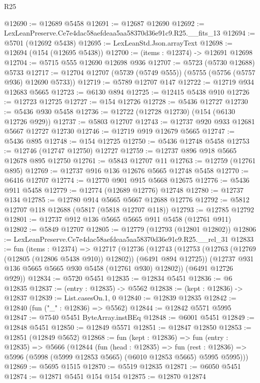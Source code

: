 \begin{lexlean}{R25}
\begin{coremodule}
@12690 := @12689 @5458
@12691 := @12687 @12690
@12692 := LexLeanPreserve.Ce7e4dac58aefdeaa5aa58370d36e91c9.R25.__fits_13
@12694 := @5701 (@12692 @5438)
@12695 := LexLeanStd.Json.arrayText
@12698 := @12694 (@154 (@12695 @5438))
@12700 := (items : @12374) -> @12691 @12698
@12704 := @5715 @555 @12690 @12698 @936
@12707 := @5723 (@5730 @12688) @5733
@12717 := @12704 @12707 (@5739 (@5749 @555)) (@5755 (@5756 (@5757 @936) @12690 @5733))
@12719 := @5789 @12707 @147
@12722 := @12719 @934 @12683 @5665
@12723 := @6130 @894
@12725 := @12415 @5438 @910
@12726 := @12723 @12725
@12727 := @154 @12726
@12728 := @5436 @12727
@12730 := @5436 @930 @5458
@12736 := @12722 (@12728 @12730) (@154 (@6130 @12726 @929))
@12737 := @5803 @12707
@12743 := @12737 @920 @933 @12681 @5667 @12727 @12730
@12746 := @12719 @919 @12679 @5665
@12747 := @5436 @895
@12748 := @154 @12725
@12750 := @5436 @12748 @5458
@12753 := @12746 (@12747 @12750) @12727
@12759 := @12737 @896 @918 @5665 @12678 @895 @12750
@12761 := @5843 @12707 @11
@12763 := @12759 (@12761 @895)
@12769 := @12737 @916 @136 @12676 @5665 @12748 @5458
@12770 := @6416 @12707
@12774 := @12770 @901 @915 @5668 @12675
@12776 := @5436 @911 @5458
@12779 := @12774 (@12689 @12776) @12748
@12780 := @12737 @134
@12785 := @12780 @914 @5665 @5667 @12688 @12776
@12792 := @5812 @12707 @118 @12688 (@5817 (@5818 @12707 @118))
@12793 := @12785 @12792
@12801 := @12737 @912 @136 @5665 @5665 @911 @5458 (@12761 @911)
@12802 := @5849 @12707
@12805 := @12779 (@12793 (@12801 @12802))
@12806 := LexLeanPreserve.Ce7e4dac58aefdeaa5aa58370d36e91c9.R25.__rel_31
@12833 := fun (items : @12374) =>
  @12717
    (@12736
      (@12743
        (@12753 (@12763 (@12769 (@12805 (@12806 @5438 @910)) @12802)) (@6491 @894 @12725))
        (@12737 @931 @136 @5665 @5665 @930 @5458 (@12761 @930) @12802))
      (@6491 @12726 @929))
@12834 := @5720 @5451
@12835 := @12834 @5451
@12836 := @6 @12835
@12837 := (entry : @12835) -> @5562
@12838 := (kept : @12836) -> @12837
@12839 := List.casesOn.{1, 0}
@12840 := @12839 @12835
@12842 := @12840 (fun ("_" : @12836) => @5562)
@12844 := @12842 @5571 @5995
@12847 := @7540 @5451 ByteArray.instBEq
@12848 := @6001 @5451
@12849 := @12848 @5451
@12850 := @12849 @5571
@12851 := @12847 @12850
@12853 := @12851 (@12849 @5652)
@12868 := fun (kept : @12836) =>
  fun (entry : @12835) =>
  @5666
    (@12844
      (fun (head : @12835) =>
      fun (rest : @12836) => @5996 (@5998 (@5999 @12853 @5665) (@6010 @12853 @5665) @5995 @5995)))
@12869 := @5695 @1515
@12870 := @5519 @12835
@12871 := @6050 @5451
@12874 := @12871 @5451 @154 @154
@12875 := @12870 @12874

\end{coremodule}
\end{lexlean}

